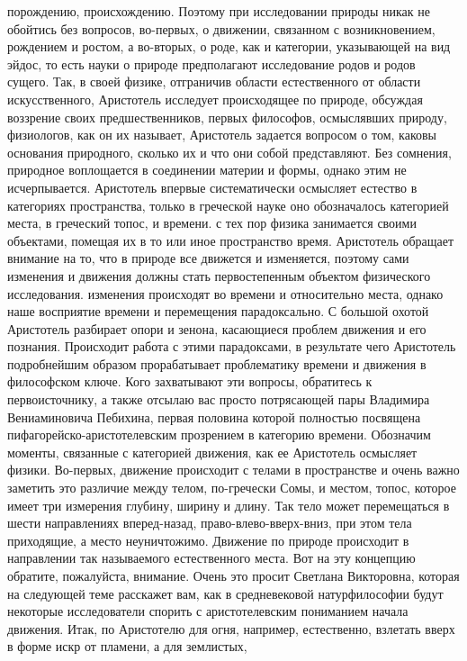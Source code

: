 порождению, происхождению. Поэтому при исследовании природы никак не обойтись
без вопросов, во-первых, о движении, связанном с возникновением, рождением и
ростом, а во-вторых, о роде, как и категории, указывающей на вид эйдос, то есть
науки о природе предполагают исследование родов и родов сущего. Так, в своей
физике, отграничив области естественного от области искусственного, Аристотель
исследует происходящее по природе, обсуждая воззрение своих предшественников,
первых философов, осмыслявших природу, физиологов, как он их называет,
Аристотель задается вопросом о том, каковы основания природного, сколько их и
что они собой представляют. Без сомнения, природное воплощается в соединении
материи и формы, однако этим не исчерпывается. Аристотель впервые систематически
осмысляет естество в категориях пространства, только в греческой науке оно
обозначалось категорией места, в греческий топос, и времени. с тех пор физика
занимается своими объектами, помещая их в то или иное пространство время.
Аристотель обращает внимание на то, что в природе все движется и изменяется,
поэтому сами изменения и движения должны стать первостепенным объектом
физического исследования. изменения происходят во времени и относительно места,
однако наше восприятие времени и перемещения парадоксально. С большой охотой
Аристотель разбирает опори и зенона, касающиеся проблем движения и его познания.
Происходит работа с этими парадоксами, в результате чего Аристотель подробнейшим
образом прорабатывает проблематику времени и движения в философском ключе. Кого
захватывают эти вопросы, обратитесь к первоисточнику, а также отсылаю вас просто
потрясающей пары Владимира Вениаминовича Пебихина, первая половина которой
полностью посвящена пифагорейско-аристотелевским прозрением в категорию времени.
Обозначим моменты, связанные с категорией движения, как ее Аристотель осмысляет
физики. Во-первых, движение происходит с телами в пространстве и очень важно
заметить это различие между телом, по-гречески Сомы, и местом, топос, которое
имеет три измерения глубину, ширину и длину. Так тело может перемещаться в шести
направлениях вперед-назад, право-влево-вверх-вниз, при этом тела приходящие, а
место неуничтожимо. Движение по природе происходит в направлении так называемого
естественного места. Вот на эту концепцию обратите, пожалуйста, внимание. Очень
это просит Светлана Викторовна, которая на следующей теме расскажет вам, как в
средневековой натурфилософии будут некоторые исследователи спорить с
аристотелевским пониманием начала движения. Итак, по Аристотелю для огня,
например, естественно, взлетать вверх в форме искр от пламени, а для землистых,
